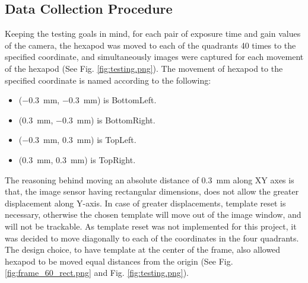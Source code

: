\subsection*{Data Collection Procedure}\label{subsection:data_collection_procedure}
Keeping the testing goals in mind, for each pair of exposure time and gain values of the camera, the hexapod was moved to each of the quadrants 40 times to the specified coordinate, and simultaneously images were captured for each movement of the hexapod (See Fig. \ref{fig:testing.png}). The movement of hexapod to the specified coordinate is named according to the following:

\begin{itemize}
    \item (\SI{-0.3}{\milli\meter}, \SI{-0.3}{\milli\meter}) is \textsf{BottomLeft}.
    \item (\SI{0.3}{\milli\meter}, \SI{-0.3}{\milli\meter}) is \textsf{BottomRight}.
    \item (\SI{-0.3}{\milli\meter}, \SI{0.3}{\milli\meter}) is \textsf{TopLeft}.
    \item (\SI{0.3}{\milli\meter}, \SI{0.3}{\milli\meter}) is \textsf{TopRight}.
\end{itemize}

\noindent The reasoning behind moving an absolute distance of \SI{0.3}{\milli\meter} along XY axes is that, the image sensor having rectangular dimensions, does not allow the greater displacement along Y-axis. In case of greater displacements, template reset is necessary, otherwise the chosen template will move out of the image window, and will not be trackable. As template reset was not implemented for this project, it was decided to move diagonally to each of the coordinates in the four quadrants. The design choice, to have template at the center of the frame, also allowed hexapod to be moved equal distances from the origin (See Fig. \ref{fig:frame_60_rect.png} and Fig. \ref{fig:testing.png}).